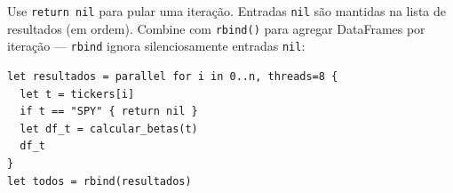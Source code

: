 Use \texttt{return nil} para pular uma iteração. Entradas \texttt{nil} são
mantidas na lista de resultados (em ordem). Combine com \texttt{rbind()}
para agregar DataFrames por iteração --- \texttt{rbind} ignora
silenciosamente entradas \texttt{nil}:

\begin{lstlisting}[caption={parallel for + rbind}]
let resultados = parallel for i in 0..n, threads=8 {
  let t = tickers[i]
  if t == "SPY" { return nil }
  let df_t = calcular_betas(t)
  df_t
}
let todos = rbind(resultados)
\end{lstlisting}
